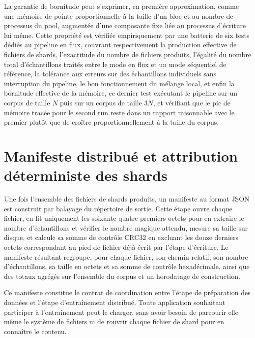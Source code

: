 \documentclass[12pt,a4paper]{report}
\begin{document}
La garantie de bornitude peut s'exprimer, en première approximation, comme une mémoire de pointe proportionnelle à la taille d'un bloc et au nombre de processus du pool, augmentée d'une composante fixe liée au processus d'écriture lui même. Cette propriété est vérifiée empiriquement par une batterie de six tests dédiés au pipeline en flux, couvrant respectivement la production effective de fichiers de shards, l'exactitude du nombre de fichiers produits, l'égalité du nombre total d'échantillons traités entre le mode en flux et un mode séquentiel de référence, la tolérance aux erreurs sur des échantillons individuels sans interruption du pipeline, le bon fonctionnement du mélange local, et enfin la bornitude effective de la mémoire, ce dernier test exécutant le pipeline sur un corpus de taille $N$ puis sur un corpus de taille $3N$, et vérifiant que le pic de mémoire tracée pour le second run reste dans un rapport raisonnable avec le premier plutôt que de croître proportionnellement à la taille du corpus.

\section{Manifeste distribué et attribution déterministe des shards}
\label{sec:manifeste_python}

Une fois l'ensemble des fichiers de shards produits, un manifeste au format JSON est construit par balayage du répertoire de sortie. Cette étape ouvre chaque fichier, en lit uniquement les soixante quatre premiers octets pour en extraire le nombre d'échantillons et vérifier le nombre magique attendu, mesure sa taille sur disque, et calcule sa somme de contrôle CRC32 en excluant les douze derniers octets correspondant au pied de fichier déjà écrit par l'étape d'écriture. Le manifeste résultant regroupe, pour chaque fichier, son chemin relatif, son nombre d'échantillons, sa taille en octets et sa somme de contrôle hexadécimale, ainsi que des totaux agrégés sur l'ensemble du corpus et un horodatage de construction.

Ce manifeste constitue le contrat de coordination entre l'étape de préparation des données et l'étape d'entraînement distribué. Toute application souhaitant participer à l'entraînement peut le charger, sans avoir besoin de parcourir elle même le système de fichiers ni de rouvrir chaque fichier de shard pour en connaître le contenu.
\end{document}

